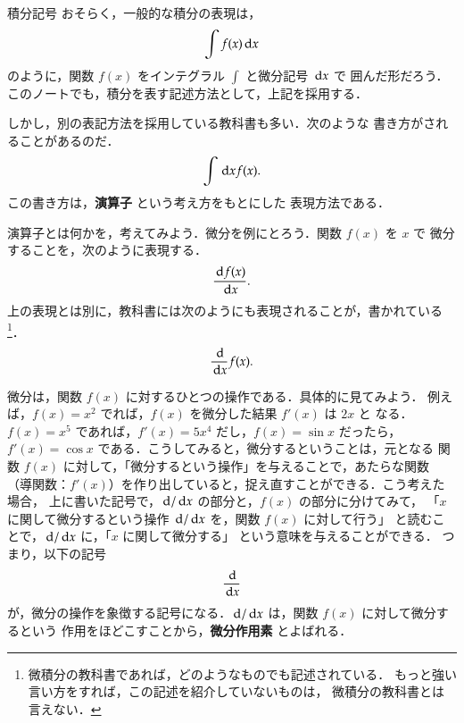     \begin{preattention}{積分記号}
        おそらく，一般的な積分の表現は，
            \begin{align*}
                \int f(x) \,\mathrm{d} x
            \end{align*}
        のように，関数 $f(x)$ をインテグラル $\int$ と微分記号 $\,\mathrm{d} x$ で
        囲んだ形だろう．このノートでも，積分を表す記述方法として，上記を採用する．

        しかし，別の表記方法を採用している教科書も多い．次のような
        書き方がされることがあるのだ．
            \begin{align*}
                \int \,\mathrm{d} x f(x).
            \end{align*}
        この書き方は，\textbf{演算子} という考え方をもとにした
        表現方法である．

        演算子とは何かを，考えてみよう．微分を例にとろう．関数 $f(x)$ を $x$ で
        微分することを，次のように表現する．
            \begin{align*}
                \frac{\,\mathrm{d} f(x)}{\,\mathrm{d} x}.
            \end{align*}
        上の表現とは別に，教科書には次のようにも表現されることが，書かれている
            \footnote{
                微積分の教科書であれば，どのようなものでも記述されている．
                もっと強い言い方をすれば，この記述を紹介していないものは，
                微積分の教科書とは言えない．
            }．
            \begin{align*}
                \frac{\,\mathrm{d}}{\,\mathrm{d} x} f(x).
            \end{align*}

        微分は，関数 $f(x)$ に対するひとつの操作である．具体的に見てみよう．
        例えば，$f(x)=x^{2}$ でれば，$f(x)$ を微分した結果 $f'(x)$ は $2x$ と
        なる．$f(x)=x^{5}$ であれば，$f'(x)=5x^{4}$ だし，$f(x)=\sin x$ だったら，
        $f'(x)=\cos x$ である．こうしてみると，微分するということは，元となる
        関数 $f(x)$ に対して，「微分するという操作」を与えることで，あたらな関数
        （導関数：$f'(x)$）を作り出していると，捉え直すことができる．こう考えた場合，
        上に書いた記号で，$\,\mathrm{d}/\,\mathrm{d} x$ の部分と，$f(x)$ の部分に分けてみて，
        「$x$ に関して微分するという操作 $\,\mathrm{d}/\,\mathrm{d} x$ を，関数 $f(x)$ に対して行う」
        と読むことで，$\,\mathrm{d}/\,\mathrm{d} x$ に，「$x$ に関して微分する」
        という意味を与えることができる．
        つまり，以下の記号
            \begin{align*}
                \frac{\,\mathrm{d}}{\,\mathrm{d} x}
            \end{align*}
        が，微分の操作を象徴する記号になる．$\,\mathrm{d}/\,\mathrm{d} x$ は，関数 $f(x)$ に対して微分するという
        作用をほどこすことから，\textbf{微分作用素} とよばれる．


\end{preattention}

